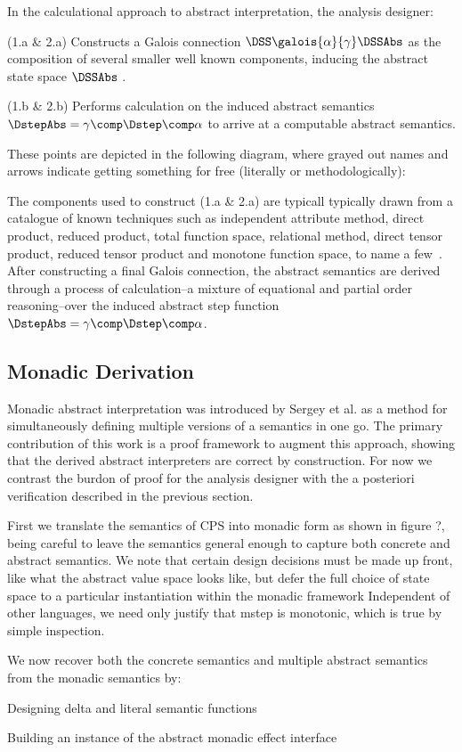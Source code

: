 In the calculational approach to abstract interpretation, the analysis designer:
%
\begin{itemizenobreak}
\item (1.a \& 2.a) Constructs a Galois connection $\DSS \galois{\alpha}{\gamma}
                   \DSSAbs$ as the composition of several smaller well known
                   components, inducing the abstract state space $\DSSAbs$ .
\item (1.b \& 2.b) Performs calculation on the induced abstract semantics
                   $\DstepAbs = \gamma \comp \Dstep \comp \alpha$ to arrive at
                   a computable abstract semantics.
\end{itemizenobreak}
%
These points are depicted in the following diagram, where grayed out names and
arrows indicate getting something for free (literally or methodologically):
%



The components used to construct (1.a \& 2.a) are typicall typically drawn from
a catalogue of known techniques such as independent attribute method, direct
product, reduced product, total function space, relational method, direct
tensor product, reduced tensor product and monotone function space, to name a
few~\cite{nielson:2004:program-analysis}.
%
After constructing a final Galois connection, the abstract semantics are
derived through a process of calculation--a mixture of equational and partial
order reasoning--over the induced abstract step function $\DstepAbs = \gamma
\comp \Dstep \comp \alpha$.



\subsection{Monadic Derivation}

Monadic abstract interpretation was introduced by Sergey et al. as a method for
simultaneously defining multiple versions of a semantics in one go.
%
The primary contribution of this work is a proof framework to augment this
approach, showing that the derived abstract interpreters are correct by
construction.
%
For now we contrast the burdon of proof for the analysis designer with the a
posteriori verification described in the previous section.

First we translate the semantics of CPS into monadic form as shown in figure
?, being careful to leave the semantics general enough to capture both concrete
and abstract semantics.
%
We note that certain design decisions must be made up front, like what the
abstract value space looks like, but defer the full choice of state space to a
particular instantiation within the monadic framework
%
Independent of other languages, we need only justify that mstep is monotonic,
which is true by simple inspection.


We now recover both the concrete semantics and multiple abstract semantics from
the monadic semantics by:
%
\begin{itemizenobreak}
  \item Designing delta and literal semantic functions
  \item Building an instance of the abstract monadic effect interface
\end{itemizenobreak}
